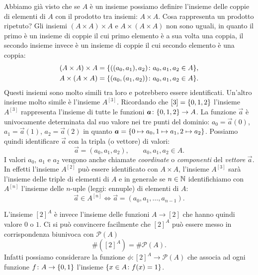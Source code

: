 Abbiamo già visto che se $A$ è un insieme possiamo definire l'insieme 
delle coppie di elementi di $A$ con il prodotto tra insiemi: $A\times A$. 
Cosa rappresenta un prodotto ripetuto?
Gli insiemi $(A\times A)\times A$ e $A\times(A\times A)$ non sono 
uguali, in quanto il primo è un insieme di coppie il cui primo elemento 
è a sua volta una coppia, il secondo insieme invece è un insieme di coppie 
il cui secondo elemento è una coppia:
\begin{gather*}
  (A\times A)\times A = {\left\{ ((a_0,a_1),a_2)\colon a_0,a_1,a_2\in A \right\}},
  \\
  A \times (A\times A) = {\left\{ (a_0,(a_1,a_2))\colon a_0,a_1,a_2\in A \right\}}.
\end{gather*}
Questi insiemi sono molto simili tra loro e potrebbero essere identificati.
Un'altro insieme molto simile è l'insieme $A^{[3]}$.  
Ricordando che $[3] = {\left\{ 0,1,2 \right\}}$ l'insieme 
$A^{[3]}$ rappresenta l'insieme di tutte le funzioni $\boldsymbol a\colon {\left\{ 0,1,2 \right\}}\to A$.
La funzione $\vec a$ è univocamente determinata dal suo valore nei 
tre punti del dominio: $a_0 = \vec a(0)$, $a_1=\vec a(1)$, $a_2=\vec a(2)$
in quanto $\boldsymbol a = {\left\{ 0\mapsto a_0, 1\mapsto a_1, 2\mapsto a_2 \right\}}$.
Possiamo quindi identificare $\vec a$ con la tripla (o vettore) di valori:
\[
  \vec a = (a_0, a_1, a_2), \qquad a_0,a_1,a_2 \in A.  
\]
I valori $a_0$, $a_1$ e $a_2$ vengono anche chiamate \emph{coordinate}
o \emph{componenti} del \emph{vettore} $\vec a$.
%
%
%
%
In effetti l'insieme $A^{[2]}$ può essere identificato con $A\times A$, l'insieme 
$A^{[3]}$ sarà l'insieme delle triple di elementi di $A$ e in generale se $n\in{\mathbb N}$ 
identifichiamo con $A^{[n]}$ l'insieme delle $n$-uple (leggi: ennuple) di elementi 
%
di $A$:
\[
   \vec a \in A^{[n]} \iff 
   \vec a = (a_0, a_1, \dots, a_{n-1}).  
\]


L'insieme $[2]^A$ è invece l'insieme delle funzioni $A\to [2]$ che hanno 
quindi valore $0$ o $1$. 
Ci si può convincere facilmente che $[2]^A$ può essere messo in corrispondenza 
biunivoca con $\mathcal P(A)$
\[
    \# ([2]^A) = \# \mathcal P(A).
\]
Infatti possiamo considerare la funzione $\phi\colon [2]^A \to \mathcal P(A)$
che associa ad ogni funzione $f\colon A\to {\left\{ 0,1 \right\}}$
l'insieme ${\left\{ x\in A \colon f(x)=1 \right\}}$.

